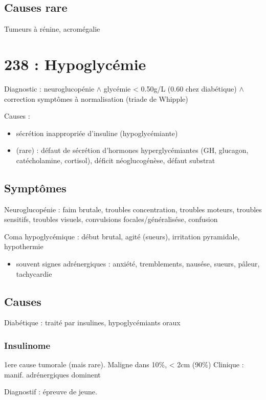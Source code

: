 \documentclass[11pt]{article}
\begin{document}
\subsection{Causes rare}
\label{sec:org90a6180}
Tumeurs à rénine, acromégalie
\section{238 : Hypoglycémie}
\label{sec:org8f45ba7}
Diagnostic : neuroglucopénie \(\land\) glycémie < 0.50g/L (0.60 chez diabétique) \(\land\) correction symptômes
à normalisation (triade de Whipple)

Causes :
\begin{itemize}
\item sécrétion inappropriée d'insuline (hypoglycémiante)
\item (rare) : défaut de sécrétion d'hormones hyperglycémiantes (GH, glucagon,
catécholamine, cortisol), déficit néoglucogénèse, défaut substrat
\end{itemize}

\subsection{Symptômes}
\label{sec:orgb72da43}
Neuroglucopénie : faim brutale, troubles concentration, troubles moteurs,
troubles sensitifs, troubles visuels, convulsions focales/généralisése,
confusion

Coma hypoglycémique : début brutal, agité (sueurs), irritation pyramidale, hypothermie

\begin{itemize}
\item souvent signes adrénergiques : anxiété, tremblements, nausése, sueurs,
pâleur, tachycardie
\end{itemize}

\subsection{Causes}
\label{sec:org9eac1ac}
Diabétique : traité par insulines, hypoglycémiants oraux

\subsubsection{Insulinome}
\label{sec:org3cac245}
1ere cause tumorale (mais rare). Maligne dans 10\%, < 2cm (90\%)
Clinique : manif. adrénergiques dominent

Diagnostif : épreuve de jeune. 
\end{document}

